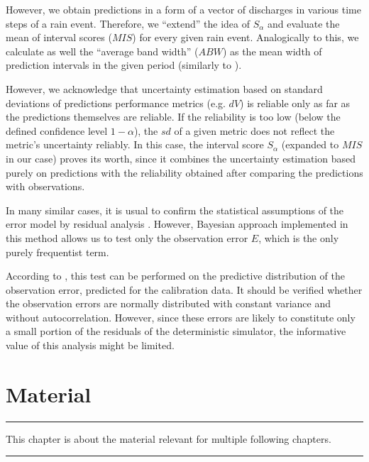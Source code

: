 \documentclass{ctuthesis}\usepackage[]{graphicx}\usepackage[]{color}
\begin{document}
However, we obtain predictions in a form of a vector of discharges in various time steps of a rain event. Therefore, we \enquote{extend} the idea of  $S_\alpha$ and evaluate the mean of interval scores ($M\!I\!S$) for every given   rain event. Analogically to this, we calculate as well the \enquote{average band width} ($A\!B\!W$) as the mean width of prediction intervals in the given period (similarly to \cite{giudice2013improving}).

However, we acknowledge that  uncertainty estimation based on  standard deviations of  predictions performance metrics (e.g. $dV$)  is reliable only as far as the predictions themselves are reliable. If the reliability is too low (below the defined confidence level $1- \alpha$), the $sd$ of a given metric does not reflect the metric's uncertainty reliably. In this case, the interval score $S_\alpha$ (expanded to  $M\!I\!S$ in our case) proves its worth, since it combines the uncertainty estimation based purely on predictions with the reliability obtained after comparing the predictions with observations.

In many similar cases, it is usual to confirm the statistical assumptions of the error model by residual analysis \citep{reichert2012linking}. However, Bayesian approach implemented in this method allows us to test only the observation error $E$, which is the only purely frequentist term. 

According to \cite{giudice2013improving}, this test can be performed on the predictive distribution of the observation error, predicted for the calibration data. It should be verified whether the observation errors are normally distributed with constant variance and without autocorrelation. However, since these errors are likely to constitute only a small portion of the residuals of the deterministic simulator, the informative value of this analysis might be limited.

        
        


\chapter{Material} \label{chap3}

\rule{\textwidth}{0.4pt}
This chapter is about the material relevant for multiple following chapters. \newline
\rule[0.2cm]{\textwidth}{0.4pt}
\end{document}
